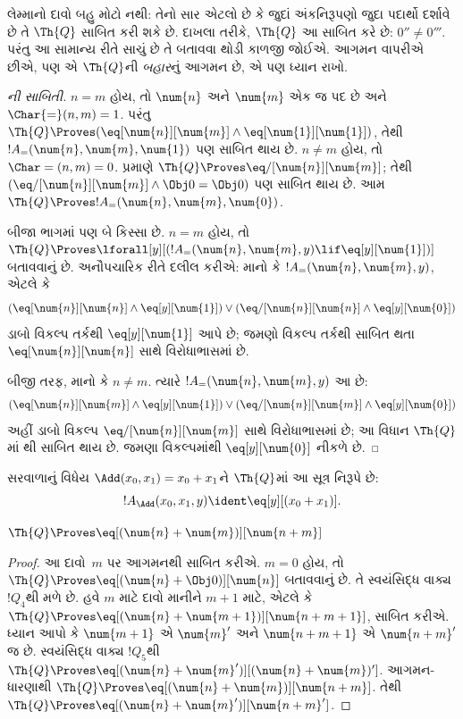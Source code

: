\begin{explain}
લેમ્માનો દાવો બહુ મોટો નથી:
તેનો સાર એટલો છે કે જુદાં
અંકનિરૂપણો જુદા પદાર્થો દર્શાવે
છે તે $\Th{Q}$ સાબિત કરી શકે છે.
દાખલા તરીકે, $\Th{Q}$ આ સાબિત
કરે છે: $0'' \neq 0'''$.
પરંતુ આ સામાન્ય રીતે સાચું છે
તે બતાવવા થોડી કાળજી જોઈએ.
આગમન વાપરીએ છીએ, પણ એ
$\Th{Q}$ની \emph{બહાર}નું
આગમન છે, એ પણ ધ્યાન રાખો.
\end{explain}

\begin{proof}[ની સાબિતી]
$n = m$ હોય, તો $\num{n}$ અને
$\num{m}$ એક જ પદ છે અને
$\Char{=}(n, m) = 1$.
પરંતુ $\Th{Q} \Proves
(\eq[\num{n}][\num{m}] \land
\eq[\num{1}][\num{1}])$,
તેથી $!A_=(\num{n}, \num{m},
\num{1})$ પણ સાબિત થાય છે.
$n \neq m$ હોય, તો
$\Char=(n, m) = 0$.
 પ્રમાણે
$\Th{Q} \Proves \eq/[\num{n}][\num{m}]$;
તેથી
$(\eq/[\num{n}][\num{m}] \land \Obj 0 = \Obj 0)$
પણ સાબિત થાય છે. આમ
$\Th{Q} \Proves !A_=(\num{n},
\num{m}, \num{0})$.

બીજા ભાગમાં પણ બે કિસ્સા છે.
$n = m$ હોય, તો
$\Th{Q} \Proves \lforall[y][(!A_=(\num{n}, \num{m}, y)
  \lif \eq[y][\num{1}])]$
બતાવવાનું છે. અનૌપચારિક રીતે
દલીલ કરીએ: માનો કે
$!A_=(\num{n}, \num{m}, y)$,
એટલે કે
\[
(\eq[\num{n}][\num{n}] \land \eq[y][\num{1}]) \lor
(\eq/[\num{n}][\num{n}] \land \eq[y][\num{0}])
\]
ડાબો વિકલ્પ તર્કથી
$\eq[y][\num{1}]$ આપે છે;
જમણો વિકલ્પ તર્કથી સાબિત થતા
$\eq[\num{n}][\num{n}]$ સાથે
વિરોધાભાસમાં છે.

બીજી તરફ, માનો કે $n \neq m$.
ત્યારે $!A_=(\num{n},
\num{m}, y)$ આ છે:
\[
(\eq[\num{n}][\num{m}] \land \eq[y][\num{1}]) \lor
(\eq/[\num{n}][\num{m}] \land \eq[y][\num{0}])
\]
અહીં ડાબો વિકલ્પ
$\eq/[\num{n}][\num{m}]$ સાથે
વિરોધાભાસમાં છે; આ વિધાન
$\Th{Q}$માં
થી
સાબિત થાય છે. જમણા
વિકલ્પમાંથી $\eq[y][\num{0}]$
નીકળે છે.
\end{proof}

\begin{prop}
સરવાળાનું વિધેય
$\Add(x_0, x_1) = x_0+x_1$ને
$\Th{Q}$માં આ સૂત્ર નિરૂપે છે:
\[
  !A_{\Add}(x_0, x_1, y) \ident \eq[y][(x_0 + x_1)].
\]
\end{prop}

\begin{lem}
$\Th{Q} \Proves \eq[(\num{n} + \num{m})][\num{n+m}]$
\end{lem}

\begin{proof}
આ દાવો~$m$ પર આગમનથી
સાબિત કરીએ. $m = 0$ હોય, તો
$\Th{Q} \Proves
\eq[(\num{n} + \Obj 0)][\num{n}]$
બતાવવાનું છે. તે સ્વયંસિદ્ધ
વાક્ય~$!Q_4$થી મળે છે.
હવે $m$ માટે દાવો માનીને
$m+1$ માટે, એટલે કે
$\Th{Q} \Proves \eq[(\num{n} +
  \num{m+1})][\num{n+m+1}]$,
સાબિત કરીએ. ધ્યાન આપો કે
$\num{m+1}$ એ $\num{m}'$
અને $\num{n+m+1}$ એ
$\num{n+m}'$ જ છે.
સ્વયંસિદ્ધ વાક્ય $!Q_5$થી
$\Th{Q} \Proves
\eq[(\num{n} + \num{m}')][(\num{n}+\num{m})']$.
આગમન-ધારણાથી
$\Th{Q} \Proves
\eq[(\num{n} + \num{m})][\num{n+m}]$.
તેથી $\Th{Q} \Proves
\eq[(\num{n} + \num{m}')][\num{n+m}']$.
\end{proof}

